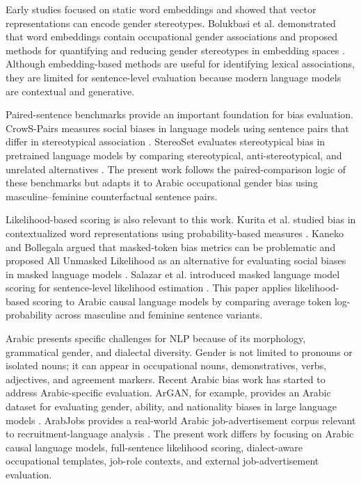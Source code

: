 \documentclass[conference]{IEEEtran}
\begin{document}
Early studies focused on static word embeddings and showed that vector representations can encode gender stereotypes. Bolukbasi et al. demonstrated that word embeddings contain occupational gender associations and proposed methods for quantifying and reducing gender stereotypes in embedding spaces \cite{bolukbasi2016}. Although embedding-based methods are useful for identifying lexical associations, they are limited for sentence-level evaluation because modern language models are contextual and generative.

Paired-sentence benchmarks provide an important foundation for bias evaluation. CrowS-Pairs measures social biases in language models using sentence pairs that differ in stereotypical association \cite{nangia2020}. StereoSet evaluates stereotypical bias in pretrained language models by comparing stereotypical, anti-stereotypical, and unrelated alternatives \cite{nadeem2021}. The present work follows the paired-comparison logic of these benchmarks but adapts it to Arabic occupational gender bias using masculine--feminine counterfactual sentence pairs.

Likelihood-based scoring is also relevant to this work. Kurita et al. studied bias in contextualized word representations using probability-based measures \cite{kurita2019}. Kaneko and Bollegala argued that masked-token bias metrics can be problematic and proposed All Unmasked Likelihood as an alternative for evaluating social biases in masked language models \cite{kaneko2022}. Salazar et al. introduced masked language model scoring for sentence-level likelihood estimation \cite{salazar2020}. This paper applies likelihood-based scoring to Arabic causal language models by comparing average token log-probability across masculine and feminine sentence variants.

Arabic presents specific challenges for NLP because of its morphology, grammatical gender, and dialectal diversity. Gender is not limited to pronouns or isolated nouns; it can appear in occupational nouns, demonstratives, verbs, adjectives, and agreement markers. Recent Arabic bias work has started to address Arabic-specific evaluation. ArGAN, for example, provides an Arabic dataset for evaluating gender, ability, and nationality biases in large language models \cite{aly2025}. ArabJobs provides a real-world Arabic job-advertisement corpus relevant to recruitment-language analysis \cite{elhaj2025}. The present work differs by focusing on Arabic causal language models, full-sentence likelihood scoring, dialect-aware occupational templates, job-role contexts, and external job-advertisement evaluation.
\end{document}
